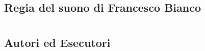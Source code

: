 \documentclass[8pt, twoside, a5paper]{extreport}
\begin{document}
{\fontsize{30}{30} }

\subsection*{\textsf{Regia del suono di Francesco Bianco}}

\bigskip

\begin{multicols}{2}




\end{multicols}

\clearpage





\section*{ }

\subsection*{\textsf{Autori ed Esecutori}\\}

{\fontsize{30}{30} }

\bigskip
\end{document}
